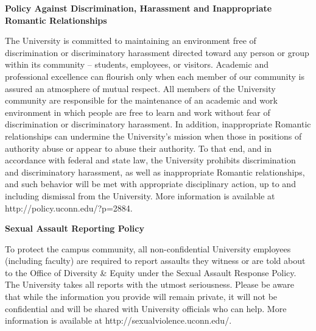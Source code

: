\documentclass[12pt]{article}
\begin{document}
{\bf Policy Against Discrimination, Harassment and Inappropriate
Romantic Relationships}

The University is committed to maintaining an environment free of
discrimination or discriminatory harassment directed toward any person
or group within its community – students, employees, or visitors.
Academic and professional excellence can flourish only when each
member of our community is assured an atmosphere of mutual respect.
All members of the University community are responsible for the
maintenance of an academic and work environment in which people are
free to learn and work without fear of discrimination or
discriminatory harassment.  In addition, inappropriate Romantic
relationships can undermine the University’s mission when those in
positions of authority abuse or appear to abuse their authority.  To
that end, and in accordance with federal and state law, the University
prohibits discrimination and discriminatory harassment, as well as
inappropriate Romantic relationships, and such behavior will be met
with appropriate disciplinary action, up to and including dismissal
from the University.  More information is available at
http://policy.uconn.edu/?p=2884.

{\bf Sexual Assault Reporting Policy}

To protect the campus community, all non-confidential University
employees (including faculty) are required to report assaults they
witness or are told about to the Office of Diversity \& Equity under
the Sexual Assault Response Policy.  The University takes all reports
with the utmost seriousness.  Please be aware that while the
information you provide will remain private, it will not be
confidential and will be shared with University officials who can
help.  More information is available at
http://sexualviolence.uconn.edu/.
\end{document}
